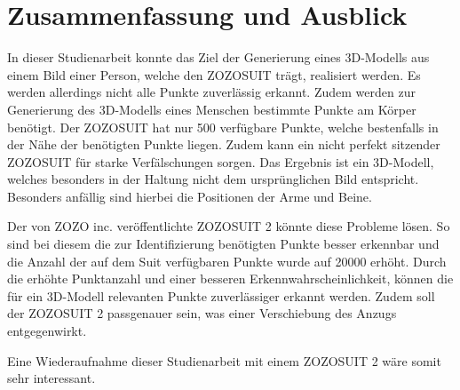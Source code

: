 \chapter{Zusammenfassung und Ausblick}

In dieser Studienarbeit konnte das Ziel der Generierung eines 3D-Modells aus einem Bild einer Person, welche den ZOZOSUIT trägt, realisiert werden. \newline
Es werden allerdings nicht alle Punkte zuverlässig erkannt. Zudem werden zur Generierung des 3D-Modells eines Menschen bestimmte Punkte am Körper benötigt. Der ZOZOSUIT hat nur 500 
verfügbare Punkte, welche bestenfalls in der Nähe der benötigten Punkte liegen. Zudem kann ein nicht perfekt sitzender ZOZOSUIT für starke Verfälschungen sorgen.\newline
Das Ergebnis ist ein 3D-Modell, welches besonders in der Haltung nicht dem ursprünglichen Bild entspricht. Besonders anfällig sind hierbei die Positionen der Arme und Beine.

Der von ZOZO inc. veröffentlichte ZOZOSUIT 2 könnte diese Probleme lösen. So sind bei diesem die zur Identifizierung benötigten Punkte besser erkennbar und die Anzahl der auf dem Suit 
verfügbaren Punkte wurde auf 20000 erhöht. \newline
Durch die erhöhte Punktanzahl und einer besseren Erkennwahrscheinlichkeit, können die für ein 3D-Modell relevanten Punkte zuverlässiger erkannt werden. Zudem soll der ZOZOSUIT 2 passgenauer 
sein, was einer Verschiebung des Anzugs entgegenwirkt.

Eine Wiederaufnahme dieser Studienarbeit mit einem ZOZOSUIT 2 wäre somit sehr interessant.